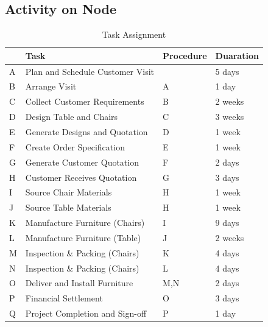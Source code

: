 \subsection{Activity on Node}
\begin{table}[!h]
    \centering
    \begin{tabular}{|l|l|l|l|}
        \hline
          & Task                             & Procedure & Duaration \\ \hline
        A & Plan and Schedule Customer Visit &           & 5 days    \\ \hline
        B & Arrange Visit                    & A         & 1 day     \\ \hline
        C & Collect Customer Requirements    & B         & 2 weeks   \\ \hline
        D & Design Table and Chairs          & C         & 3 weeks   \\ \hline
        E & Generate Designs and Quotation   & D         & 1 week    \\ \hline
        F & Create Order Specification       & E         & 1 week    \\ \hline
        G & Generate Customer Quotation      & F         & 2 days    \\ \hline
        H & Customer Receives Quotation      & G         & 3 days    \\ \hline
        I & Source Chair Materials           & H         & 1 week    \\ \hline
        J & Source Table Materials           & H         & 1 week    \\ \hline
        K & Manufacture Furniture (Chairs)   & I         & 9 days    \\ \hline
        L & Manufacture Furniture (Table)    & J         & 2 weeks   \\ \hline
        M & Inspection \& Packing (Chairs)   & K         & 4 days    \\ \hline
        N & Inspection \& Packing (Chairs)   & L         & 4 days    \\ \hline
        O & Deliver and Install Furniture    & M,N       & 2 days    \\ \hline
        P & Financial Settlement             & O         & 3 days    \\ \hline
        Q & Project Completion and Sign-off  & P         & 1 day     \\ \hline
    \end{tabular}
    \caption{Task Assignment}
    \label{table:task_assignment}
\end{table}


